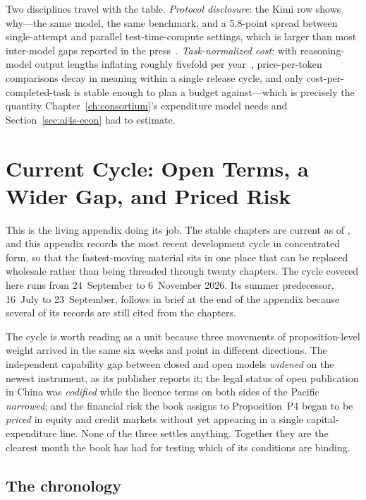 Two disciplines travel with the table. \emph{Protocol disclosure}: the Kimi row shows why---the same model, the same benchmark, and a 5.8-point spread between single-attempt and parallel test-time-compute settings, which is larger than most inter-model gaps reported in the press~\cite{kimi-k2-thinking}. \emph{Task-normalized cost}: with reasoning-model output lengths inflating roughly fivefold per year~\cite{epoch-output}, price-per-token comparisons decay in meaning within a single release cycle, and only cost-per-completed-task is stable enough to plan a budget against---which is precisely the quantity Chapter~\ref{ch:consortium}'s expenditure model needs and Section~\ref{sec:ai4s-econ} had to estimate.

\chapter{Current Cycle: Open Terms, a Wider Gap, and Priced Risk}
\label{app:bulletin}

This is the living appendix doing its job. The stable chapters are current as of \datafreeze, and this appendix records the most recent development cycle in concentrated form, so that the fastest-moving material sits in one place that can be replaced wholesale rather than being threaded through twenty chapters. The cycle covered here runs from 24~September to 6~November 2026. Its summer predecessor, 16~July to 23~September, follows in brief at the end of the appendix because several of its records are still cited from the chapters.

The cycle is worth reading as a unit because three movements of proposition-level weight arrived in the same six weeks and point in different directions. The independent capability gap between closed and open models \emph{widened} on the newest instrument, as its publisher reports it; the legal status of open publication in China was \emph{codified} while the licence terms on both sides of the Pacific \emph{narrowed}; and the financial risk the book assigns to Proposition~P4 began to be \emph{priced} in equity and credit markets without yet appearing in a single capital-expenditure line. None of the three settles anything. Together they are the clearest month the book has had for testing which of its conditions are binding.

\section{The chronology}

